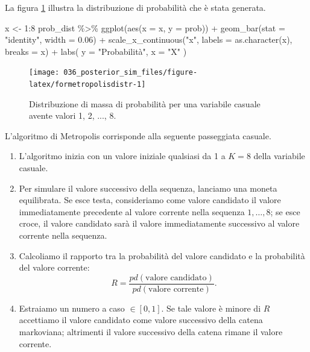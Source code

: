 \documentclass[
  10pt,
  italian,
  a4paper,
  extrafontsizes,onecolumn,openright
  ]{memoir}
\newenvironment{Shaded}{\begin{snugshade}}{\end{snugshade}}
\newcommand{\AttributeTok}[1]{\textcolor[rgb]{0.77,0.63,0.00}{#1}}
\newcommand{\DecValTok}[1]{\textcolor[rgb]{0.00,0.00,0.81}{#1}}
\newcommand{\FloatTok}[1]{\textcolor[rgb]{0.00,0.00,0.81}{#1}}
\newcommand{\FunctionTok}[1]{\textcolor[rgb]{0.00,0.00,0.00}{#1}}
\newcommand{\NormalTok}[1]{#1}
\newcommand{\OtherTok}[1]{\textcolor[rgb]{0.56,0.35,0.01}{#1}}
\newcommand{\SpecialCharTok}[1]{\textcolor[rgb]{0.00,0.00,0.00}{#1}}
\newcommand{\StringTok}[1]{\textcolor[rgb]{0.31,0.60,0.02}{#1}}
\providecommand{\tightlist}{%
  \setlength{\itemsep}{0pt}\setlength{\parskip}{0pt}}
\begin{document}
\noindent
La figura \ref{fig:formetropolisdistr} illustra la distribuzione di probabilità che è stata generata.

\begin{Shaded}
\begin{Highlighting}[]
\NormalTok{x }\OtherTok{\textless{}{-}} \DecValTok{1}\SpecialCharTok{:}\DecValTok{8}
\NormalTok{prob\_dist }\SpecialCharTok{\%\textgreater{}\%}
  \FunctionTok{ggplot}\NormalTok{(}\FunctionTok{aes}\NormalTok{(}\AttributeTok{x =}\NormalTok{ x, }\AttributeTok{y =}\NormalTok{ prob)) }\SpecialCharTok{+}
  \FunctionTok{geom\_bar}\NormalTok{(}\AttributeTok{stat =} \StringTok{"identity"}\NormalTok{, }\AttributeTok{width =} \FloatTok{0.06}\NormalTok{) }\SpecialCharTok{+}
  \FunctionTok{scale\_x\_continuous}\NormalTok{(}\StringTok{"x"}\NormalTok{, }\AttributeTok{labels =} \FunctionTok{as.character}\NormalTok{(x), }\AttributeTok{breaks =}\NormalTok{ x) }\SpecialCharTok{+}
  \FunctionTok{labs}\NormalTok{(}
    \AttributeTok{y =} \StringTok{"Probabilità"}\NormalTok{,}
    \AttributeTok{x =} \StringTok{"X"}
\NormalTok{  )}
\end{Highlighting}
\end{Shaded}

\begin{figure}[h]

{\centering \texttt{[image: 036\_posterior\_sim\_files/figure-latex/formetropolisdistr-1]} 

}

\caption{Distribuzione di massa di probabilità per una variabile casuale avente valori 1, 2, ..., 8.}\label{fig:formetropolisdistr}
\end{figure}

\noindent
L'algoritmo di Metropolis corrisponde alla seguente passeggiata casuale.

\begin{enumerate}
\def\labelenumi{\arabic{enumi}.}
\tightlist
\item
  L'algoritmo inizia con un valore iniziale qualsiasi da 1 a \(K=8\) della variabile casuale.
\item
  Per simulare il valore successivo della sequenza, lanciamo una moneta equilibrata. Se esce testa, consideriamo come valore candidato il valore immediatamente precedente al valore corrente nella sequenza \(1, \dots, 8\); se esce croce, il valore candidato sarà il valore immediatamente successivo al valore corrente nella sequenza.
\item
  Calcoliamo il rapporto tra la probabilità del valore candidato e la probabilità del valore corrente:
  \[
  R = \frac{pd(\text{valore candidato})}{pd(\text{valore corrente})}.
  \]
\item
  Estraiamo un numero a caso \(\in [0, 1]\). Se tale valore è minore di \(R\) accettiamo il valore candidato come valore successivo della catena markoviana; altrimenti il valore successivo della catena rimane il valore corrente.
\end{enumerate}
\end{document}
